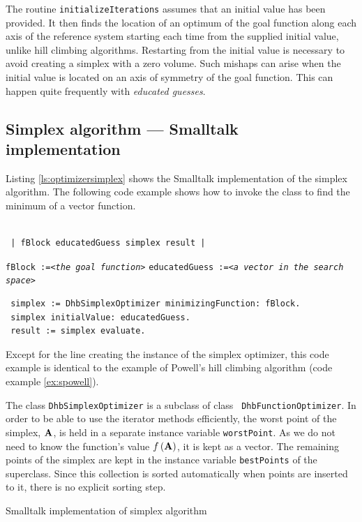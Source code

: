 \documentclass[twoside]{book}
\begin{document}
The routine {\tt initializeIterations} assumes that an initial
value has been provided. It then finds the location of an optimum
of the goal function along each axis of the reference system
starting each time from the supplied initial value, unlike hill
climbing algorithms. Restarting from the initial value is
necessary to avoid creating a simplex with a zero volume. Such
mishaps can arise when the initial value is located on an axis of
symmetry of the goal function. This can happen quite frequently
with {\sl educated guesses}.

\subsection{Simplex algorithm --- Smalltalk implementation}
 Listing \ref{ls:optimizersimplex} shows
the Smalltalk implementation of the simplex algorithm. The
following code example shows how to invoke the class to find the
minimum of a vector function.
\begin{codeExample}
\begin{verbatim}

 | fBlock educatedGuess simplex result |
\end{verbatim}
 {\tt fBlock :=<\sl the goal function\tt >}\hfil\break
 {\tt educatedGuess :=<\sl a vector in the search space\tt >}
\begin{verbatim}
 simplex := DhbSimplexOptimizer minimizingFunction: fBlock.
 simplex initialValue: educatedGuess.
 result := simplex evaluate.
\end{verbatim}
\end{codeExample}
Except for the line creating the instance of the simplex
optimizer, this code example is identical to the example of
Powell's hill climbing algorithm (code example \ref{ex:spowell}).

The class {\tt DhbSimplexOptimizer} is a subclass of class {\tt
DhbFunctionOptimizer}. In order to be able to use the iterator
methods efficiently, the worst point of the simplex, ${\bf A}$, is
held in a separate instance variable {\tt worstPoint}. As we do
not need to know the function's value $f\left({\bf A}\right)$, it
is kept as a vector. The remaining points of the simplex are kept
in the instance variable {\tt bestPoints} of the superclass. Since
this collection is sorted automatically when points are inserted
to it, there is no explicit sorting step.

\begin{listing} Smalltalk implementation of simplex algorithm
\label{ls:optimizersimplex}

\end{listing}
\end{document}
